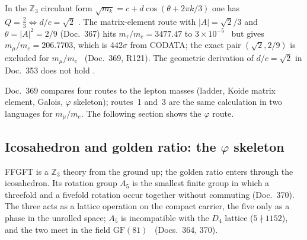 In the $\mathbb Z_3$ circulant form
$\sqrt{m_k}=c+d\cos(\theta+2\pi k/3)$ one has $Q=\tfrac23\Leftrightarrow d/c=\sqrt2$ \BM. The
matrix-element route with $|A|=\sqrt2/3$ and $\theta=|A|^2=2/9$ (Doc.~367) hits
$m_\tau/m_e=3477.47$ to $3\times10^{-5}$ \KM\ but gives $m_\mu/m_e=206.7703$, which is
442$\sigma$ from CODATA; the exact pair $(\sqrt2,2/9)$ is excluded for $m_\mu/m_e$ \XM\
(Doc.~369, R121). The geometric derivation of $d/c=\sqrt2$ in Doc.~353 does not hold \SM.

Doc.~369 compares four routes to the lepton masses (ladder, Koide matrix element, Galois,
$\varphi$ skeleton); routes~1 and~3 are the same calculation in two languages for $m_\mu/m_e$.
The following section shows the $\varphi$ route.

\subsection{Icosahedron and golden ratio: the \texorpdfstring{$\varphi$}{phi} skeleton}

FFGFT is a $\mathbb Z_3$ theory from the ground up; the golden ratio enters through the
icosahedron. Its rotation group $A_5$ is the smallest finite group in which a threefold and a
fivefold rotation occur together without commuting (Doc.~370). The three acts as a lattice
operation on the compact carrier, the five only as a phase in the unrolled space; $A_5$ is
incompatible with the $D_4$ lattice ($5\nmid1152$), and the two meet in the field
$\mathrm{GF}(81)$ \BM\ (Docs.~364, 370).

